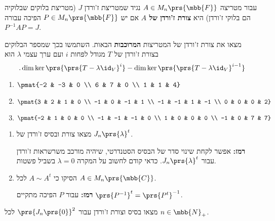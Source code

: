 \documentclass[a4paper,10pt,twoside,openany]{article}
\renewcommand{\emph}[1]{\textbf{#1}}
\begin{document}
\begin{exercise}
עבור מטריצה
$A \in M_n\prs{\mbb{F}}$
נגיד שמטריצת ז'ורדן $J$ (מטריצת בלוקים שבלוקיה הם בלוקי ז'ורדן) היא
\emph{צורת ז'ורדן של
$A$}
אם יש
$P \in M_n\prs{\mbb{F}}$
הפיכה עבורה
$P^{-1} A P = J$.

מצאו את צורת ז'ורדן של המטריצות
\emph{המרוכבות}
הבאות.
השתמשו בכך שמספר הבלוקים בצורת ז'ורדן של
$T$
מגודל לפחות
$i$
ועם ערך עצמי
$\lambda$
הוא
\[\text{.} \dim \ker\prs{\prs{T - \lambda \id_V}^i} - \dim \ker\prs{\prs{T - \lambda \id_V}^{i-1}}\]

\begin{enumerate}
\item $\pmat{-2 & -3 & 0 \\ 6 & 7 & 0 \\ 1 & 1 & 4}$
\item $\pmat{3 & 2 & 1 & 0 \\ -1 & 0 & -1 & 1 \\ -1 & -1 & 1 & -1 \\ 0 & 0 & 0 & 2}$
\item $\pmat{-2 & 1 & 0 & 0 \\ -1 & -1 & -1 & 0 \\ 1 & 0 & 0 & 0 \\ -1 & 0 & 7 & 7}$
\end{enumerate}
\end{exercise}

\begin{exercise}
\begin{enumerate}
\item מצאו צורת ובסיס ז'ורדן של
$J_n\prs{\lambda}^t$.

\emph{רמז:}
אפשר לקחת שינוי סדר של הבסיס הסטנדרטי, שיהיה מורכב משרשראות ז'ורדן עבור
$J_n\prs{\lambda}^t$.
כדאי קודם לחשוב על המקרה
$\lambda = 0$
בשביל פשטות.

\item הסיקו כי
$A \sim A^t$
לכל
$A \in M_n\prs{\mbb{C}}$.

\textbf{רמז:}
עבור
$P$
הפיכה מתקיים
$\prs{P^{-1}}^t = \prs{P^t}^{-1}$.
\end{enumerate}
\end{exercise}

\begin{exercise}
\item מצאו בסיס וצורת ז'ורדן עבור
$\prs{J_n\prs{0}}^2$
לכל
$n \in \mbb{N}_+$.
\end{exercise}
\end{document}
